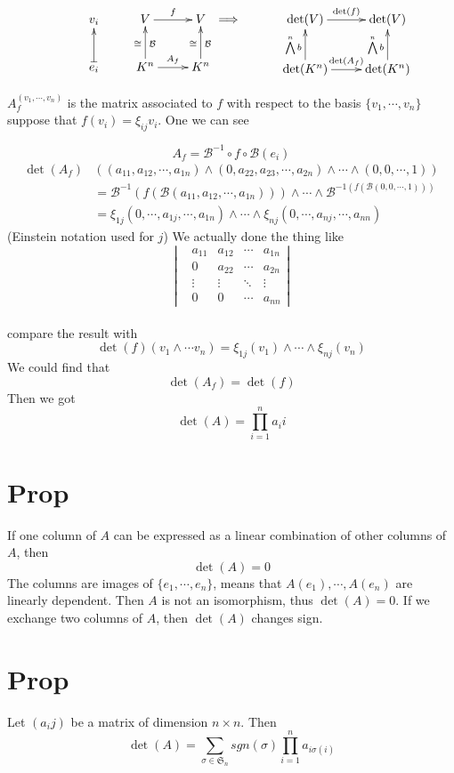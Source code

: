 \documentclass{book}
\begin{document}
$$\xymatrix{
    &v_i &V\ar[r]^f &V \\
    &e_i\ar@{|->}[u] &K^n\ar[u]_{\mathcal{B}}^\cong \ar[r]^{A_f} &K^n\ar[u]^\cong_{\mathcal{B}}
}
\Longrightarrow
\xymatrix{
    &\det(V)\ar[r]^{\det(f)} &\det(V)\\
    &\det(K^n)\ar[u]^{\bigwedge\limits^nb}\ar[r]^{\det(A_f)} &\det(K^n)\ar[u]^{\bigwedge\limits^nb}
}
$$ 

$A_f^{(v_1,\cdots,v_n)}$ is the matrix associated to $f$ with respect to the basis $\{v_1,\cdots,v_n\}$
suppose that $f(v_i)=\xi_{ij}v_i$. One we can see

$$A_f=\mathcal{B}^{-1}\circ f\circ\mathcal{B}(e_i)$$
$$\begin{aligned}
    \det (A_f) &((a_{11},a_{12},\cdots,a_{1n})\wedge(0,a_{22},a_{23},\cdots,a_{2n})\wedge\cdots\wedge(0,0,\cdots,1))
    \\ &=\mathcal{B}^{-1}(f(\mathcal{B}(a_{11},a_{12},\cdots,a_{1n})))\wedge\cdots\wedge\mathcal{B}^{-1(f(\mathcal{B}(0,0,\cdots,1)))}\\
    &=\xi_{1j}(0,\cdots,a_{1j},\cdots,a_{1n})\wedge\cdots\wedge\xi_{nj}(0,\cdots,a_{nj},\cdots,a_{nn})
\end{aligned}$$
(Einstein notation used for $j$)
We actually done the thing like
$$\left\lvert\begin{aligned}
    &a_{11}&a_{12}&\cdots&a_{1n}\\
    &0&a_{22}&\cdots&a_{2n}\\
    &\vdots&\vdots&\ddots&\vdots\\
    &0&0&\cdots&a_{nn}
\end{aligned}\right\rvert$$
\\compare the result with 
$$\det(f)(v_1\wedge\cdots v_n)=\xi_{1j}(v_1)\wedge\cdots\wedge\xi_{nj}(v_n)$$
We could find that $$\det(A_f)=\det(f)$$
Then we got $$\det(A)=\prod\limits_{i=1}^na_ii$$
\section{Prop}
If one column of $A$ can be expressed as a linear combination of other columns of $A$, then $$\det(A)=0$$
The columns are images of $\{e_1,\cdots,e_n\}$, means that $A(e_1),\cdots,A(e_n)$ are linearly dependent. Then $A$ is not an isomorphism, thus $\det(A)=0$.
If we exchange two columns of $A$, then $\det(A)$ changes sign.
\section{Prop}
Let $(a_ij)$ be a matrix of dimension $n\times n$. Then $$\det(A)=\sum\limits_{\sigma\in\mathfrak{S}_n}sgn(\sigma)\prod\limits_{i=1}^na_{i\sigma(i)}$$
\end{document}
